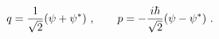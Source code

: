 \begin{equation}
q={\frac{1}{\sqrt{2}}}(\psi +\psi ^{\ast })\ ,\qquad p=-{\frac{i\hbar }{%
\sqrt{2}}}(\psi -\psi ^{\ast })\ .  \label{qp}
\end{equation}%
